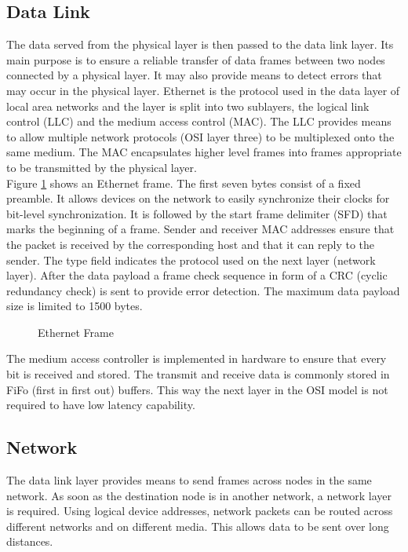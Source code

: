 \subsection{Data Link} 
The data served from the physical layer is then passed to the data link layer.
Its main purpose is to ensure a reliable transfer of data frames between two
nodes connected by a physical layer. It may also provide means to detect errors
that may occur in the physical layer. Ethernet is the protocol used in the data
layer of local area networks and the layer is split into two sublayers, the logical
link control (LLC) and the medium access control (MAC). The LLC provides means
to allow multiple network protocols (OSI layer three) to be multiplexed onto
the same medium. The MAC encapsulates higher level frames into frames 
appropriate to be transmitted by the physical layer.
\\

Figure \ref{fig:eth} shows an Ethernet frame. The first seven bytes consist of a
fixed preamble. It allows devices on the network to easily synchronize their 
clocks for bit-level synchronization. It is followed by the start frame delimiter
(SFD) that marks the beginning of a frame. Sender and receiver MAC addresses 
ensure that the packet is received by the corresponding host and that it can 
reply to the sender. The type field indicates the protocol used on the next layer
(network layer). After the data payload a frame check sequence in form of a CRC
(cyclic redundancy check) is sent to provide error detection. The maximum data
payload size is limited to 1500 bytes.
\\

\clearpage
\begin{figure}[tb!]
    \centering
    \begin{adjustbox}{max width=\textwidth}
        
    \end{adjustbox}
    \caption{Ethernet Frame}
    \label{fig:eth}
\end{figure}
The medium access controller is implemented in hardware to ensure that every bit
is received and stored. The transmit and receive data is commonly stored in
FiFo (first in first out) buffers. This way the next layer in the OSI model is
not required to have low latency capability.

\subsection{Network} 
The data link layer provides means to send frames across nodes in the same
network. As soon as the destination node is in another network, a network layer
is required. Using logical device addresses, network packets can be routed
across different networks and on different media. This allows data to be sent
over long distances.
\\

